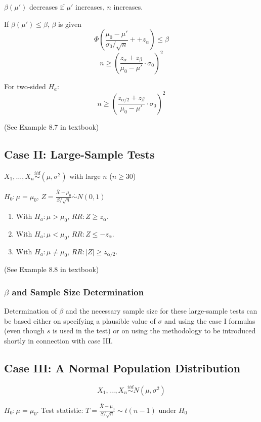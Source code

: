 $\beta(\mu')$ decreases if $\mu'$ increases, $n$ increases.

If $\beta(\mu')\leq \beta$, $\beta$ is given
\[ \Phi\left( \frac{\mu_0-\mu'}	{\sigma_0/\sqrt{n} }++z_{\alpha}  \right)\leq \beta\]
\[n \geq \left(\frac{z_{\alpha}+ z_{\beta}}{\mu_0-\mu'}\cdot\sigma_0\right)^2\]

For two-sided $H_a$:
\[n \geq \left(\frac{z_{\alpha/2}+ z_{\beta}}{\mu_0-\mu'}\cdot\sigma_0\right)^2\]

\begin{exmp}
(See Example 8.7 in textbook)
\end{exmp}

\subsection{Case II: Large-Sample Tests}
$X_1,\dots,X_n \overset{iid}{\sim} (\mu,\sigma^2)$ with large $n$ ($n \geq 30$)

$H_0:\mu=\mu_0$, $Z=\frac{\bar{X}-\mu_0}{S/\sqrt{n}} \overset{\cdot}{\sim}N(0,1)$
\begin{enumerate}
\item With $H_a: \mu>\mu_0$, $RR:Z\geq z_{\alpha}$.
\item With $H_a: \mu<\mu_0$, $RR:Z\leq -z_{\alpha}$.
\item With $H_a: \mu\neq\mu_0$, $RR:|Z|\geq z_{\alpha/2}$.
\end{enumerate}

\begin{exmp}
(See Example 8.8 in textbook)
\end{exmp}

\subsubsection{$\beta$ and Sample Size Determination}

Determination of $\beta$ and the necessary sample size for these large-sample tests can be based either on specifying a plausible value of $\sigma$ and using the case I formulas (even though $s$ is used in the test) or on using the methodology to be introduced shortly in connection with case III.

\subsection{Case III: A Normal Population Distribution}
\[X_1,\dots,X_n \overset{iid}{\sim} N(\mu,\sigma^2)\]

$H_0:\mu=\mu_0$. Test statistic: $T=\frac{\bar{X}-\mu_0}{S/\sqrt{n}} \sim t(n-1) \text{ under } H_0$

